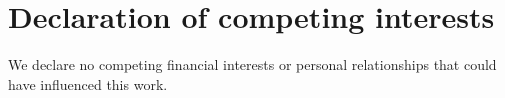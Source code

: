 \section*{Declaration of competing interests}
We declare no competing financial interests or personal relationships
that could have influenced this work.
